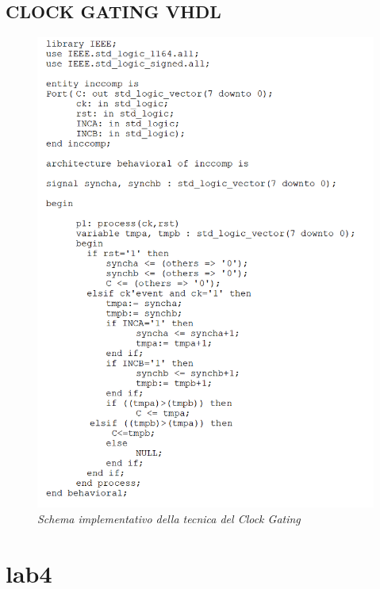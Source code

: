 \subsection{CLOCK GATING VHDL}
\begin{figure}[!htb]
	\centering
	\includegraphics[scale=1]{immagini/3_vhdl}
	\caption{\textit{Schema implementativo della tecnica del Clock Gating}}
	\label{3_vhdl}
\end{figure}
\newpage
\section{lab4}
